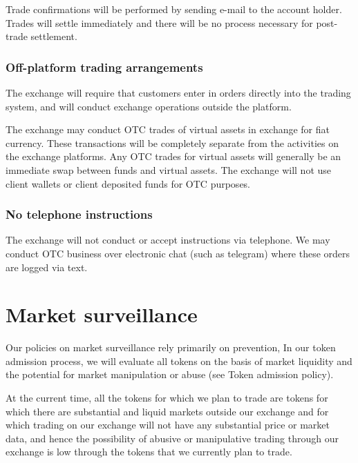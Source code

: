 Trade confirmations will be performed by sending e-mail to the account
holder.  Trades will settle immediately and there will be no
process necessary for post-trade settlement.

\subsubsection{Off-platform trading arrangements}
The exchange will require that customers enter in orders directly into
the trading system, and will conduct exchange operations outside
the platform.

The exchange may conduct OTC trades of virtual assets in exchange for
fiat currency.  These transactions will be completely separate from
the activities on the exchange platforms.  Any OTC trades for virtual
assets will generally be an immediate swap between funds
and virtual assets.  The exchange will not use client wallets or
client deposited funds for OTC purposes.

\subsubsection{No telephone instructions}
The exchange will not conduct or accept instructions via telephone.
We may conduct OTC business over electronic chat (such as telegram) where
these orders are logged via text.

\section{Market surveillance}

Our policies on market surveillance rely primarily on prevention, In
our token admission process, we will evaluate all tokens on the basis
of market liquidity and the potential for market manipulation or abuse
(see Token admission policy).

At the current time, all the tokens for which we plan to trade are
tokens for which there are substantial and liquid markets outside
our exchange and for which trading on our exchange will not have any
substantial price or market data, and hence the possibility of abusive
or manipulative trading through our exchange is low through the tokens
that we currently plan to trade.


